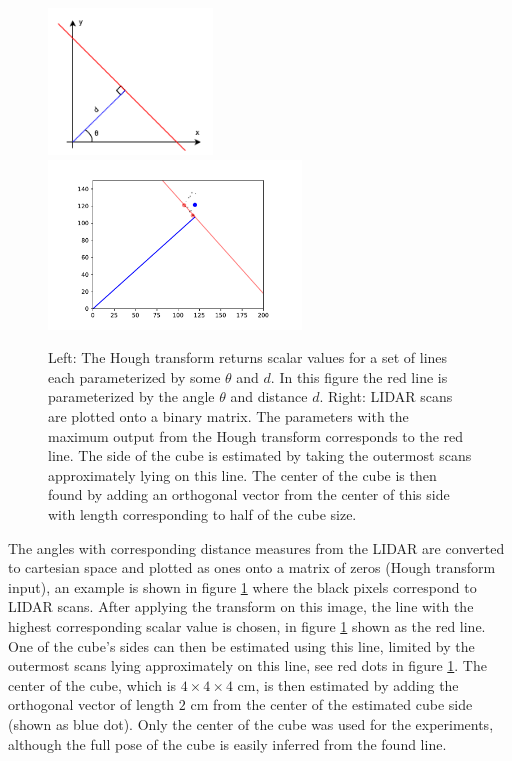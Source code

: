 \begin{figure}[h]
    \centering
    \includegraphics[width=0.39\textwidth]{res/hough.pdf}
    \includegraphics[width=0.60\textwidth]{res/hough_example.pdf}

    \caption{Left: The Hough transform returns scalar values for a set of lines each
    parameterized by some $\theta$ and $d$. In this figure the red line is
    parameterized by the angle $\theta$ and distance $d$.
    Right: LIDAR scans are plotted onto a binary matrix. The parameters with
    the maximum output from the Hough transform corresponds to the red line.
    The side of the cube is estimated by taking the outermost scans
    approximately lying on this line. The center of the cube is then found by
    adding an orthogonal vector from the center of this side with length
    corresponding to half of the cube size.}

    \label{fig:hough}
\end{figure}

The angles with corresponding distance measures from the LIDAR are converted to
cartesian space and plotted as ones onto a matrix of zeros (Hough transform
input), an example is shown in figure \ref{fig:hough} where the black pixels
correspond to LIDAR scans. After applying the transform on this image, the line
with the highest corresponding scalar value is chosen, in figure
\ref{fig:hough} shown as the red line. One of the cube's sides can then be
estimated using this line, limited by the outermost scans lying approximately
on this line, see red dots in figure \ref{fig:hough}. The center of the cube,
which is $4\times 4\times 4$ cm, is then estimated by adding the orthogonal
vector of length $2$ cm from the center of the estimated cube side (shown as
blue dot). Only the center of the cube was used for the experiments, although
the full pose of the cube is easily inferred from the found line.

